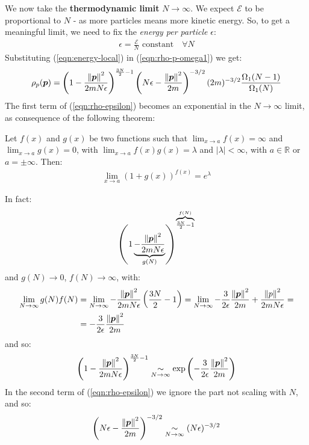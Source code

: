 \documentclass[../../main.tex]{subfiles}
\begin{document}
We now take the \textbf{thermodynamic limit} $N \to \infty$. We expect $\mathcal{E}$ to be proportional to $N$ - as more particles means more kinetic energy. So, to get a meaningful limit, we need to fix the \textit{energy per particle}  $\epsilon$:
\begin{align}
    \epsilon = \frac{\mathcal{E}}{N} \text{ constant} \quad \forall N  \label{eqn:energy-local}
\end{align}
Substituting (\ref{eqn:energy-local}) in (\ref{eqn:rho-p-omega1}) we get:
\begin{align}\label{eqn:rho-epsilon}
    \rho_p(\bm{p}) =  \left(1-\frac{\norm{\bm{p}}^2}{2mN\epsilon} \right)^{\frac{3N}{2}-1} \left(N\epsilon-\frac{\norm{\bm{p}}^2}{2m} \right)^{-3/2} (2m)^{-3/2} \frac{\Omega_1(N-1)}{\Omega_1(N)}
\end{align} 
The first term of (\ref{eqn:rho-epsilon}) becomes an exponential in the $N \to \infty$ limit, as consequence of the following theorem:

\begin{thm}
    Let $f(x)$ and $g(x)$ be two functions such that $\lim_{x \to a} f(x) = \infty $ and $\lim_{x \to a} g(x) = 0$, with $\lim_{x \to a} f(x) g(x) = \lambda$ and $|\lambda | < \infty$, with $a \in \mathbb{R}$ or $a = \pm \infty$. Then:
\begin{align*}
    \lim_{x \to a} (1+g(x))^{f(x)} = e^{\lambda}
\end{align*}
\end{thm}

In fact:
\begin{align*}
    \left(1\underbrace{-\frac{\norm{\bm{p}}^2}{2mN\epsilon}}_{g(N)} \right)^{\overbrace{\scriptstyle \frac{3N}{2}-1}^{f(N)}} 
\end{align*}
and $g(N) \to 0$, $f(N) \to \infty$, with:
\begin{align*}
    \lim_{N \to \infty} g(N) f(N) &= \lim_{N \to\infty } -\frac{\norm{\bm{p}}^2}{2 m N \epsilon}\left(\frac{3N}{2} -1\right) = \lim_{N \to \infty} -\frac{3}{2\epsilon} \frac{\norm{\bm{p}}^2}{2 m} + \frac{\norm{p}^2}{2m N \epsilon} =\\
    &= -\frac{3}{2\epsilon} \frac{\norm{\bm{p}}^2}{2 m}
\end{align*}
and so:
\begin{align*}
    \left(1-\frac{\norm{\bm{p}}^2}{2mN\epsilon} \right)^{\frac{3N}{2}-1}  \underset{N \to \infty}{\sim}  \exp\left(-\frac{3}{2 \epsilon} \frac{\norm{\bm{p}}^2}{2m} \right) 
\end{align*}
In the second term of (\ref{eqn:rho-epsilon}) we ignore the part not scaling with $N$, and so:
\begin{align*}
    \left(N\epsilon-\frac{\norm{\bm{p}}^2}{2m} \right)^{-3/2} \underset{N \to \infty}{\sim}  (N \epsilon)^{-3/2}
\end{align*}
\end{document}
